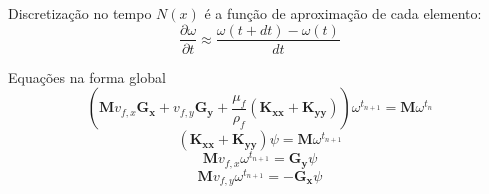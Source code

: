 \documentclass{beamer}
\begin{document}
\begin{frame}
  \frametitle{\subsecname}
  
  \begin{block}{Discretização no tempo}
    $N(x)$ é a função de aproximação de cada elemento:
    \begin{equation*}
      \dfrac{\partial \omega}{\partial t} \approx
      \frac{
	  \omega(t + dt) -
	  \omega(t)
      }{dt}
    \end{equation*}
  \end{block}
  
  \begin{block}{Equações na forma global}
    \begin{equation*}
      \left(
	  \mathbf{M} v_{f,x} \mathbf{G_x} + v_{f,y} \mathbf{G_y} + \dfrac{\mu_f}{\rho_f}
	  \left( \mathbf{K_{xx}} + \mathbf{K_{yy}} \right)
      \right)
      \omega^{t_{n+1}} = \mathbf{M} \omega^{t_{n}}
      \label{last_w}
    \end{equation*}
    \begin{equation*}
      \left( \mathbf{K_{xx}} + \mathbf{K_{yy}} \right)
      \psi = \mathbf{M} \omega^{t_{n+1}}
      \label{last_psi}
    \end{equation*}
    \begin{equation*}
      \mathbf{M} v_{f,x} \omega^{t_{n+1}} =
      \mathbf{G_y} \psi
      \label{last_vx}
    \end{equation*}
    \begin{equation*}
      \mathbf{M} v_{f,y} \omega^{t_{n+1}} = 
      -\mathbf{G_x} \psi
      \label{last_vy}
    \end{equation*}
  \end{block}
\end{frame}

\end{document}
